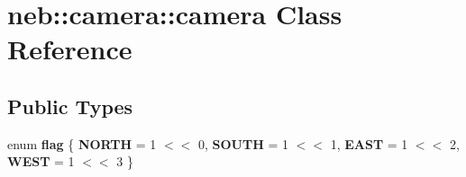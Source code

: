 \hypertarget{classneb_1_1camera_1_1camera}{\section{neb\-:\-:camera\-:\-:camera \-Class \-Reference}
\label{classneb_1_1camera_1_1camera}
}
\subsection*{\-Public \-Types}
\begin{DoxyCompactItemize}
\item 
enum {\bfseries flag} \{ {\bfseries \-N\-O\-R\-T\-H} =  1 $<$$<$ 0, 
{\bfseries \-S\-O\-U\-T\-H} =  1 $<$$<$ 1, 
{\bfseries \-E\-A\-S\-T} =  1 $<$$<$ 2, 
{\bfseries \-W\-E\-S\-T} =  1 $<$$<$ 3
 \}
\end{DoxyCompactItemize}
